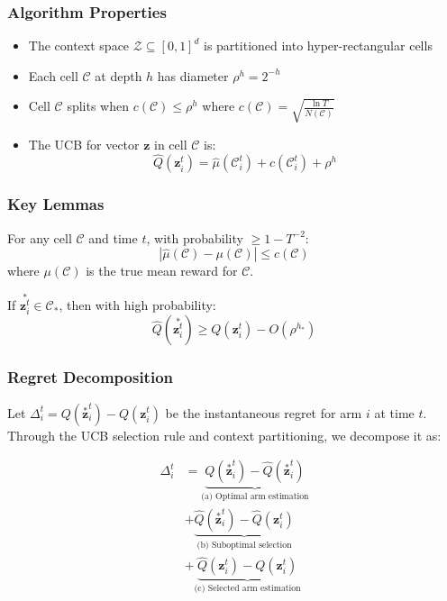 \subsubsection{Algorithm Properties}
\begin{itemize}
    \item The context space $\mathcal{Z}\subseteq[0,1]^d$ is partitioned into hyper-rectangular cells
    \item Each cell $\mathcal{C}$ at depth $h$ has diameter $\rho^h=2^{-h}$
    \item Cell $\mathcal{C}$ splits when $c(\mathcal{C}) \leq \rho^h$ where $c(\mathcal{C})=\sqrt{\frac{\ln T}{N(\mathcal{C})}}$
    \item The UCB for vector $\mathbf{z}$ in cell $\mathcal{C}$ is:
    \[
    \hat{Q}(\mathbf{z}_i^t) = \hat{\mu}(\mathcal{C}_i^t) + c(\mathcal{C}_i^t) + \rho^h
    \]
\end{itemize}

\subsubsection{Key Lemmas}

\begin{lemma}
For any cell $\mathcal{C}$ and time $t$, with probability $\geq 1-T^{-2}$:
\[
|\hat{\mu}(\mathcal{C}) - \mu(\mathcal{C})| \leq c(\mathcal{C})
\]
where $\mu(\mathcal{C})$ is the true mean reward for $\mathcal{C}$.
\end{lemma}

\begin{lemma}
If \(\overset{*}{\mathbf{z}_i^t} \in \mathcal{C}_*\), then with high probability:
\[
\hat{Q}(\overset{*}{\mathbf{z}_i^t}) \geq Q(\mathbf{z}_i^t) - O(\rho^{h_*})
\]

\end{lemma}

\subsubsection{Regret Decomposition}

Let $\Delta_i^t = Q(\overset{*}{\mathbf{z}}_i^t) - Q(\mathbf{z}_i^t)$ be the instantaneous regret for arm $i$ at time $t$. Through the UCB selection rule and context partitioning, we decompose it as:

\begin{align}
\Delta_i^t &= \underbrace{Q(\overset{*}{\mathbf{z}}_i^t) - \hat{Q}(\overset{*}{\mathbf{z}}_i^t)}_{\text{(a) Optimal arm estimation}} \nonumber \\
          &+ \underbrace{\hat{Q}(\overset{*}{\mathbf{z}}_i^t) - \hat{Q}(\mathbf{z}_i^t)}_{\text{(b) Suboptimal selection}} \nonumber \\
          &+ \underbrace{\hat{Q}(\mathbf{z}_i^t) - Q(\mathbf{z}_i^t)}_{\text{(c) Selected arm estimation}} \label{eq:decomp}
\end{align}

